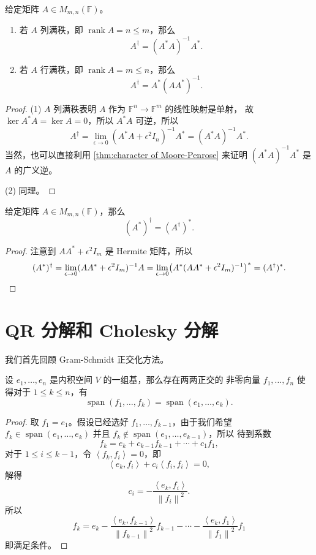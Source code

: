 \documentclass[fontset=none,zihao=-4]{Notes}
\DeclareMathOperator\rank{rank}
\newcommand{\inn}[1]{\left\langle#1\right\rangle}
\newcommand{\norm}[1]{\left\lVert#1\right\rVert}
\newcommand{\spa}[1]{\operatorname{span}\left(#1\right)}
\begin{document}
\begin{corollary}
  给定矩阵 $A\in M_{m,n}(\mathbb{F})$。
  \begin{enumerate}
    \item 若 $A$ 列满秩，即 $\rank A=n\le m$，那么
    \[
      A^\dagger=(A^*A)^{-1}A^*.  
    \]
    \item 若 $A$ 行满秩，即 $\rank A=m\leq n$，那么
    \[
      A^\dagger =A^*(AA^*)^{-1}.  
    \]
  \end{enumerate}
\end{corollary}
\begin{proof}
  (1) $A$ 列满秩表明 $A$ 作为 $\mathbb{F}^n\to\mathbb{F}^m$ 的线性映射是单射，
  故 $\ker A^*A=\ker A=0$，所以 $A^*A$ 可逆，所以
  \[
    A^\dagger =\lim_{\epsilon\to 0}(A^*A+\epsilon^2 I_n)^{-1}A^*=(A^*A)^{-1}A^*.  
  \]
  当然，也可以直接利用 \autoref{thm:character of Moore-Penrose} 来证明
  $(A^*A)^{-1}A^*$ 是 $A$ 的广义逆。

  (2) 同理。
\end{proof}

\begin{corollary}
  给定矩阵 $A\in M_{m,n}(\mathbb{F})$，那么
  \[
    (A^*)^\dagger=(A^\dagger)^*.  
  \]
\end{corollary}
\begin{proof}
  注意到 $AA^*+\epsilon^2 I_m$ 是 Hermite 矩阵，所以
  \[
    (A^*)^\dagger=\lim_{\epsilon\to 0}(AA^*+\epsilon^2 I_m)^{-1}A
    =\lim_{\epsilon\to 0} \bigl(A^*(AA^*+\epsilon^2 I_m)^{-1}\bigr)^*=
    (A^\dagger)^*.\qedhere
  \]
\end{proof}

\section{QR 分解和 Cholesky 分解}

我们首先回顾 Gram-Schmidt 正交化方法。

\begin{theorem}
  设 $e_1,\dots,e_n$ 是内积空间 $V$ 的一组基，那么存在两两正交的
  非零向量 $f_1,\dots,f_n$ 使得对于 $1\leq k\leq n$，有
  \[
    \spa{f_1,\dots,f_k}=\spa{e_1,\dots,e_k}.  
  \]
\end{theorem}
\begin{proof}
  取 $f_1=e_1$。假设已经选好 $f_1,\dots,f_{k-1}$，由于我们希望
  $f_k\in\spa{e_1,\dots,e_k}$ 并且 $f_k\notin\spa{e_1,\dots,e_{k-1}}$，所以
  待到系数
  \[
    f_k=e_k+c_{k-1}f_{k-1}+\cdots+c_1f_1,  
  \]
  对于 $1\leq i\leq k-1$，令 $\inn{f_k,f_i}=0$，即
  \[
    \inn{e_k,f_i}+c_i\inn{f_i,f_i}=0,  
  \]
  解得
  \[
      c_i=-\frac{\inn{e_k,f_i}}{\norm{f_i}^2}.
  \]
  所以
  \[
    f_k=e_k-\frac{\inn{e_k,f_{k-1}}}{\norm{f_{k-1}}^2}f_{k-1}-\cdots-\frac{\inn{e_k,f_1}}{\norm{f_1}^2}f_1  
  \]
  即满足条件。
\end{proof}
\end{document}
